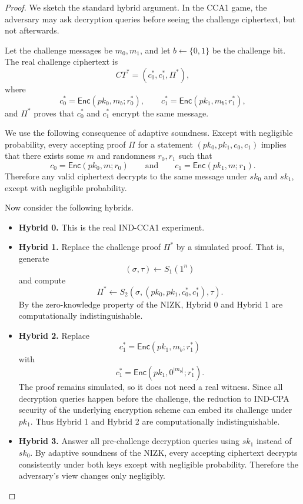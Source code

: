 \begin{proof}
We sketch the standard hybrid argument. In the CCA1 game, the adversary may ask
decryption queries before seeing the challenge ciphertext, but not afterwards.

Let the challenge messages be $m_0,m_1$, and let $b\gets \{0,1\}$ be the
challenge bit. The real challenge ciphertext is
\[
CT^*=(c_0^*,c_1^*,\Pi^*),
\]
where
\[
c_0^*=\mathsf{Enc}(pk_0,m_b;r_0^*),
\qquad
c_1^*=\mathsf{Enc}(pk_1,m_b;r_1^*),
\]
and $\Pi^*$ proves that $c_0^*$ and $c_1^*$ encrypt the same message.

We use the following consequence of adaptive soundness. Except with negligible
probability, every accepting proof $\Pi$ for a statement
$(pk_0,pk_1,c_0,c_1)$ implies that there exists some $m$ and randomness
$r_0,r_1$ such that
\[
c_0=\mathsf{Enc}(pk_0,m;r_0)
\qquad\text{and}\qquad
c_1=\mathsf{Enc}(pk_1,m;r_1).
\]
Therefore any valid ciphertext decrypts to the same message under $sk_0$ and
$sk_1$, except with negligible probability.

Now consider the following hybrids.

\begin{itemize}
    \item \textbf{Hybrid 0.} This is the real IND-CCA1 experiment.

    \item \textbf{Hybrid 1.} Replace the challenge proof $\Pi^*$ by a simulated
    proof. That is, generate
    \[
    (\sigma,\tau)\gets S_1(1^n)
    \]
    and compute
    \[
    \Pi^*\gets S_2(\sigma,(pk_0,pk_1,c_0^*,c_1^*),\tau).
    \]
    By the zero-knowledge property of the NIZK, Hybrid 0 and Hybrid 1 are
    computationally indistinguishable.

    \item \textbf{Hybrid 2.} Replace
    \[
    c_1^*=\mathsf{Enc}(pk_1,m_b;r_1^*)
    \]
    with
    \[
    c_1^*=\mathsf{Enc}(pk_1,0^{|m_b|};r_1^*).
    \]
    The proof remains simulated, so it does not need a real witness. Since all
    decryption queries happen before the challenge, the reduction to IND-CPA
    security of the underlying encryption scheme can embed its challenge under
    $pk_1$. Thus Hybrid 1 and Hybrid 2 are computationally indistinguishable.

    \item \textbf{Hybrid 3.} Answer all pre-challenge decryption queries using
    $sk_1$ instead of $sk_0$. By adaptive soundness of the NIZK, every accepting
    ciphertext decrypts consistently under both keys except with negligible
    probability. Therefore the adversary's view changes only negligibly.


\end{itemize}
\end{proof}
